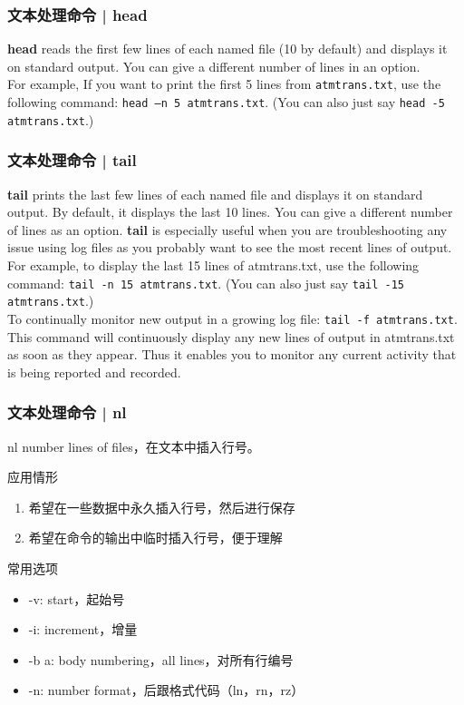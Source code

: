 \begin{frame}[fragile]
  \frametitle{文本处理命令 | head}
  \textbf{head} reads the first few lines of each named file (10 by default) and displays it on standard output. You can give a different number of lines in an option.\\
  \vspace{0.3cm}
  For example, If you want to print the first 5 lines from \verb|atmtrans.txt|, use the following command: \verb|head –n 5 atmtrans.txt|. (You can also just say \verb|head -5 atmtrans.txt|.)
\end{frame}

\begin{frame}[fragile]
  \frametitle{文本处理命令 | tail}
  \textbf{tail} prints the last few lines of each named file and displays it on standard output. By default, it displays the last 10 lines. You can give a different number of lines as an option. \textbf{tail} is especially useful when you are troubleshooting any issue using log files as you probably want to see the most recent lines of output.\\
  \vspace{0.3cm}
  For example, to display the last 15 lines of atmtrans.txt, use the following command: \verb|tail -n 15 atmtrans.txt|. (You can also just say \verb|tail -15 atmtrans.txt|.)\\
  \vspace{0.3cm}
  To continually monitor new output in a growing log file: \verb|tail -f atmtrans.txt|. This command will continuously display any new lines of output in atmtrans.txt as soon as they appear. Thus it enables you to monitor any current activity that is being reported and recorded.
\end{frame}

\begin{frame}
  \frametitle{文本处理命令 | nl}
  \begin{block}{nl}
    number lines of files，在文本中插入行号。
  \end{block}
  \pause
  \begin{block}{应用情形}
    \begin{enumerate}
      \item 希望在一些数据中永久插入行号，然后进行保存
      \item 希望在命令的输出中临时插入行号，便于理解
    \end{enumerate}
  \end{block}
  \pause
  \begin{block}{常用选项}
    \begin{itemize}
      \item -v: start，起始号
      \item -i: increment，增量
      \item -b a: body numbering，all lines，对所有行编号
      \item -n: number format，后跟格式代码（ln，rn，rz）
    \end{itemize}
  \end{block}
\end{frame}

